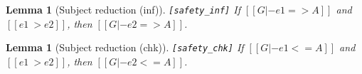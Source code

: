 \documentclass[oneside,a4paper]{article}
\newtheorem{lemma}[theorem]{Lemma}
\numberwithin{equation}{section}
\begin{document}
\begin{lemma}[Subject reduction (inf)]\verb|[safety_inf]|
  If $[[G |- e1 => A]]$ 
  and $[[e1 ~> e2]]$, then 
  $[[G |- e2 => A]]$.
\end{lemma}

\begin{lemma}[Subject reduction (chk)]\verb|[safety_chk]|
  If $[[G |- e1 <= A]]$ 
  and $[[e1 ~> e2]]$, then 
  $[[G |- e2 <= A]]$.
\end{lemma}

%
%
%
\end{document}
